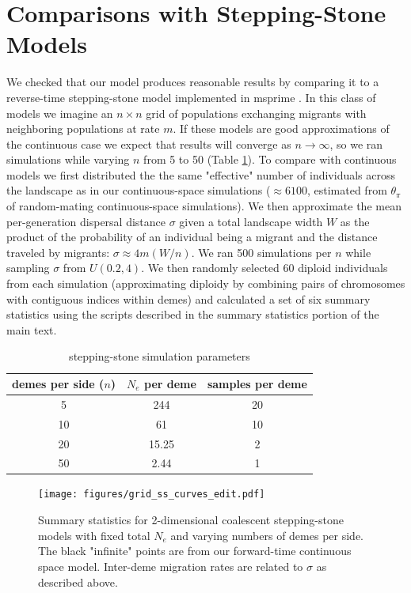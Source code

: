 \documentclass[10pt,twoside,lineno,hidelinks]{preprint}
\begin{document}
\section{Comparisons with Stepping-Stone Models}

We checked that our model produces reasonable results by comparing it to a reverse-time stepping-stone model implemented in msprime \citep{Kelleher2016}. In this class of models we imagine an $n \times n$ grid of populations exchanging migrants with neighboring populations at rate $m$. If these models are good approximations of the continuous case we expect that results will converge as $n \to \infty$, so we ran simulations while varying $n$ from 5 to 50 (Table \ref{table:grid_params}). To compare with continuous models we first distributed the the same "effective" number of individuals across the landscape as in our continuous-space simulations ($\approx 6100$, estimated from $\theta_{\pi}$ of random-mating continuous-space simulations). We then approximate the mean per-generation dispersal distance $\sigma$ given a total landscape width $W$ as the product of the probability of an individual being a migrant and the distance traveled by migrants: $\sigma \approx 4m(W/n)$. We ran 500 simulations per $n$ while sampling $\sigma$ from $U(0.2,4)$. We then randomly selected 60 diploid individuals from each simulation (approximating diploidy by combining pairs of chromosomes with contiguous indices within demes) and calculated a set of six summary statistics using the scripts described in the summary statistics portion of the main text. 

\begin{table}[h]
\centering
\begin{tabular}{ccc}
     demes per side ($n$)&$N_e$ per deme  & samples per deme  \\
     \hline
     5 & 244 & 20 \\
     10 & 61 & 10 \\
     20 & 15.25 & 2 \\
     50 & 2.44 & 1 \\
\end{tabular}
\captionsetup{justification=centering}
\caption{stepping-stone simulation parameters}
\label{table:grid_params}
\end{table}


\begin{figure}[h]
\centering
\texttt{[image: figures/grid\_ss\_curves\_edit.pdf]}
\caption{Summary statistics for 2-dimensional coalescent stepping-stone models with fixed total $N_{e}$ and varying numbers of demes per side. The black "infinite" points are from our forward-time continuous space model. Inter-deme migration rates are related to $\sigma$ as described above.}
\label{fig:grid_stats}
\end{figure}
\end{document}
